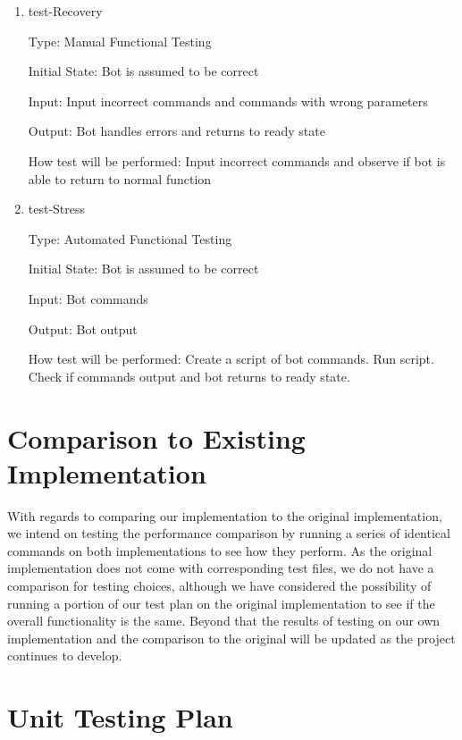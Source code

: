 \documentclass[12pt, titlepage]{article}
\begin{document}
\begin{enumerate}

\item{test-Recovery\\}

Type: Manual Functional Testing
					
Initial State: Bot is assumed to be correct
					
Input: Input incorrect commands and commands with wrong parameters
					
Output: Bot handles errors and returns to ready state
					
How test will be performed: Input incorrect commands and observe if bot is able to return to normal function
					
\item{test-Stress\\}

Type: Automated Functional Testing
					
Initial State: Bot is assumed to be correct
					
Input: Bot commands
					
Output: Bot output
					
How test will be performed:  Create a script of bot commands. Run script. Check if commands output and bot returns to ready state. 

\end{enumerate}	

\section{Comparison to Existing Implementation}	

With regards to comparing our implementation to the original implementation, we intend on testing the performance comparison by running a series of identical commands on both implementations to see how they perform. As the original implementation does not come with corresponding test files, we do not have a comparison for testing choices, although we have considered the possibility of running a portion of our test plan on the original implementation to see if the overall functionality is the same. Beyond that the results of testing on our own implementation and the comparison to the original will be updated as the project continues to develop. 
				
\section{Unit Testing Plan}
		
\end{document}
